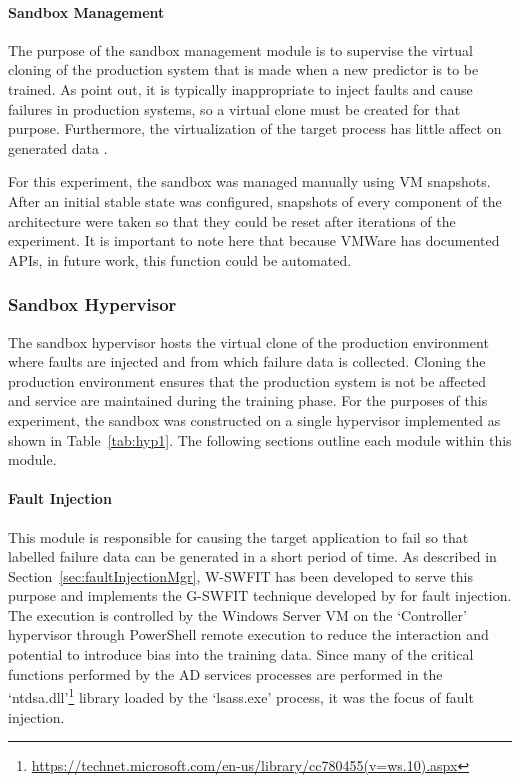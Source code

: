 \paragraph{Sandbox Management} \label{sec:sandboxMgr} 
The purpose of the sandbox management module is to supervise the virtual
cloning of the production system that is made when a new predictor is to be
trained.  As \citet{irrera2013,irrera2015} point out, it is typically
inappropriate to inject faults and cause failures in production systems, so a
virtual clone must be created for that purpose.  Furthermore, the
virtualization of the target process has little affect on generated data
\citep{irrera2013}.

For this experiment, the sandbox was managed manually using \ac{VM} snapshots.
After an initial stable state was configured, snapshots of every component of
the architecture were taken so that they could be reset after iterations of the
experiment.  It is important to note here that because VMWare has documented
\ac{API}s, in future work, this function could be automated.

\subsubsection{Sandbox Hypervisor} \label{sec:sandbox}
The sandbox hypervisor hosts the virtual clone of the production environment
where faults are injected and from which failure data is collected.  Cloning
the production environment ensures that the production system is not be
affected and service are maintained during the training phase.  For the
purposes of this experiment, the sandbox was constructed on a single hypervisor
implemented as shown in Table~\ref{tab:hyp1}.  The following sections outline
each module within this module.

\paragraph{Fault Injection} \label{sec:faultInjectionTool} 
This module is responsible for causing the target application to fail so that
labelled failure data can be generated in a short period of time.  As described
in Section~\ref{sec:faultInjectionMgr}, \ac{W-SWFIT} has been developed to
serve this purpose and implements the \ac{G-SWFIT} technique developed by
\citet{gswfit} for fault injection.  The execution is controlled by the Windows
Server \ac{VM} on the `Controller' hypervisor through PowerShell remote
execution to reduce the interaction and potential to introduce bias into the
training data.  Since many of the critical functions performed by the \ac{AD}
services processes are performed in the
`ntdsa.dll'\footnote{\url{https://technet.microsoft.com/en-us/library/cc780455(v=ws.10).aspx}}
library loaded by the `lsass.exe' process, it was the focus of fault injection.

